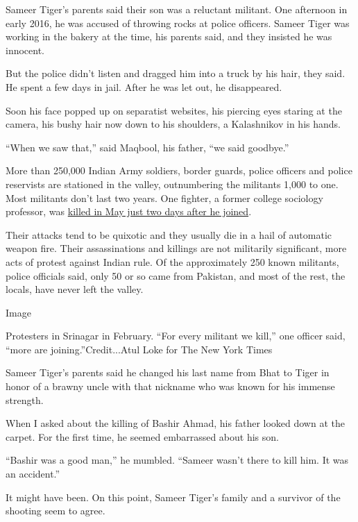 Sameer Tiger's parents said their son was a reluctant militant. One
afternoon in early 2016, he was accused of throwing rocks at police
officers. Sameer Tiger was working in the bakery at the time, his
parents said, and they insisted he was innocent.

But the police didn't listen and dragged him into a truck by his hair,
they said. He spent a few days in jail. After he was let out, he
disappeared.

Soon his face popped up on separatist websites, his piercing eyes
staring at the camera, his bushy hair now down to his shoulders, a
Kalashnikov in his hands.

``When we saw that,'' said Maqbool, his father, ``we said goodbye.''

More than 250,000 Indian Army soldiers, border guards, police officers
and police reservists are stationed in the valley, outnumbering the
militants 1,000 to one. Most militants don't last two years. One
fighter, a former college sociology professor, was
\href{https://www.firstpost.com/india/kashmir-university-professor-rafi-bhat-gets-killed-within-40-hrs-of-joining-militancy-students-colleagues-in-shock-4458433.html}{killed
in May just two days after he joined}.

Their attacks tend to be quixotic and they usually die in a hail of
automatic weapon fire. Their assassinations and killings are not
militarily significant, more acts of protest against Indian rule. Of the
approximately 250 known militants, police officials said, only 50 or so
came from Pakistan, and most of the rest, the locals, have never left
the valley.

Image

Protesters in Srinagar in February. ``For every militant we kill,'' one
officer said, ``more are joining.''Credit...Atul Loke for The New York
Times

Sameer Tiger's parents said he changed his last name from Bhat to Tiger
in honor of a brawny uncle with that nickname who was known for his
immense strength.

When I asked about the killing of Bashir Ahmad, his father looked down
at the carpet. For the first time, he seemed embarrassed about his son.

``Bashir was a good man,'' he mumbled. ``Sameer wasn't there to kill
him. It was an accident.''

It might have been. On this point, Sameer Tiger's family and a survivor
of the shooting seem to agree.

